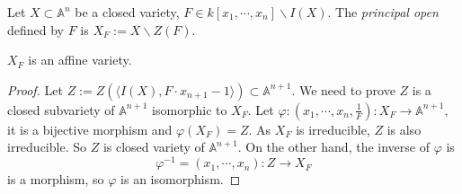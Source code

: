 \begin{definition}
	Let $ X\subset \mathbb{A}^n $ be a closed variety, $ F\in k[x_1,\cdots,x_n]\backslash I(X) $. The \textit{principal open} defined by $ F $ is $ X_F:=X\backslash Z(F) $.
\end{definition}
\begin{proposition}\label{14}
	$ X_F $ is an affine variety.
\end{proposition}
\begin{proof}
	Let $ Z:=Z(\langle I(X),F\cdot x_{n+1}-1\rangle )\subset \mathbb{A}^{n+1} $. We need to prove $ Z $ is a closed subvariety of $ \mathbb{A}^{n+1} $ isomorphic to $ X_F $. Let $ \varphi:(x_1,\cdots,x_n,\frac{1}{F}):X_F\to \mathbb{A}^{n+1} $, it is a bijective morphism and $ \varphi(X_F)=Z $. As $ X_F $ is irreducible, $ Z $ is also irreducible. So $ Z $ is closed variety of $ \mathbb{A}^{n+1} $. On the other hand, the inverse of $ \varphi $ is
	$$
		\varphi^{-1}=(x_1,\cdots,x_n):Z\to X_F
	$$
	is a morphism, so $ \varphi $ is an isomorphism.
\end{proof}
